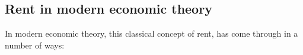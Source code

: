 
\subsection{Rent in modern economic theory}
In modern economic theory, this classical concept of rent, has come through in a number of ways: 
